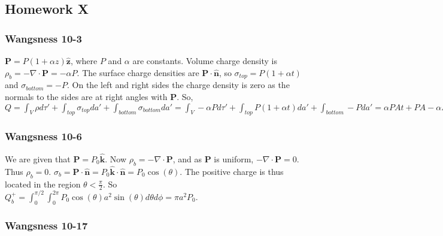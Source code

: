 \documentclass[oneside]{book}
\theoremstyle{definition}
\newcommand*\B[1]{\mathbf{#1}}
\newcommand*\Bh[1]{\mathbf{\hat{#1}}}
\begin{document}
\subsection*{Homework X}

\subsubsection{Wangsness 10-3}

$\B{P}= P(1+\alpha z)\Bh{z}$, where $P$ and $\alpha$ are constants. Volume charge density is $\rho_{b} = -\nabla \cdot \B{P} = -\alpha P$. The surface charge densities are $\B{P}\cdot \Bh{n}$, so $\sigma_{top} = P(1+\alpha t)$ and $\sigma_{bottom} = -P$. On the left and right sides the charge density is zero as the normals to the sides are at right angles with $\B{P}$. So, $Q = \int_{V} \rho d\tau' + \int_{top} \sigma_{top} da' + \int_{bottom} \sigma_{bottom} da' = \int_{V}-\alpha P d\tau' + \int_{top}P(1+\alpha t) da' + \int_{bottom} - Pda' = \alpha PAt + PA - \alpha PA t - PA = 0$
\begin{figure}[!h]
  \centering
\end{figure}

\subsubsection{Wangsness 10-6}

We are given that $\B{P} = P_0 \Bh{k}$. Now $\rho_{b} = -\nabla \cdot \B{P}$, and as $\B{P}$ is uniform, $-\nabla \cdot \B{P} = 0$. Thus $\rho_b = 0$. $\sigma_b = \B{P}\cdot \Bh{n} = P_0 \Bh{k} \cdot \Bh{n} = P_0 \cos(\theta)$. The positive charge is thus located in the region $\theta < \frac{\pi}{2}$. So $Q_b^+ = \int_{0}^{\pi/2}\int_{0}^{2\pi} P_0 \cos(\theta) a^2 \sin(\theta) d\theta d\phi = \pi a^2 P_0$.

\begin{figure}[!h]
  \centering
\end{figure}

\subsubsection{Wangsness 10-17}
\end{document}
